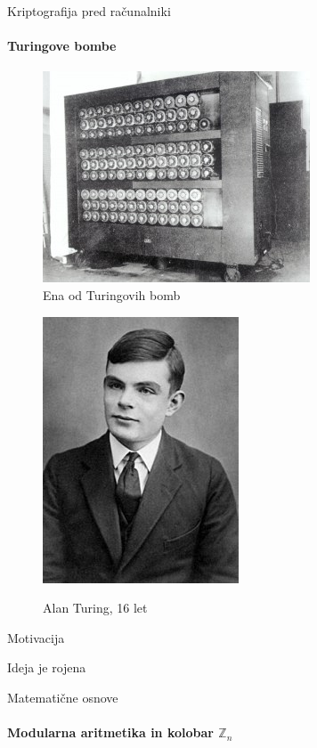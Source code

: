 \documentclass[a4paper, 12pt]{beamer} %
\newcommand{\Zn}{\mathbb{Z}_n}
\begin{document}
\begin{frame}{Kriptografija pred računalniki}
\framesubtitle{Turingove bombe}
\begin{minipage}[b]{0.45\linewidth}
\begin{figure}
\centering
\includegraphics[scale=0.6]{turingbomb}
\caption{Ena od Turingovih bomb}
\label{fig:bomba}
\end{figure}
\end{minipage}
\hfill
\begin{minipage}[b]{0.45\linewidth}
\begin{figure}
\centering
\includegraphics[scale=0.5]{AlanTuring16}
\label{fig:turing}
\caption{Alan Turing, 16 let}
\end{figure}
\end{minipage}
\end{frame}

\begin{frame}{Motivacija}
\end{frame}

\begin{frame}{Ideja je rojena}
\end{frame}

\begin{frame}{Matematične osnove}
\framesubtitle{Modularna aritmetika in kolobar $\Zn$}
\end{frame}
\end{document}
